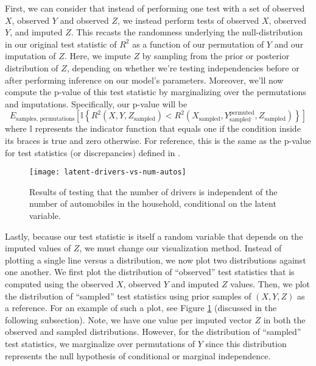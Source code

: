 First, we can consider that instead of performing one test with a set of observed $X$, observed $Y$ and observed $Z$, we instead perform tests of observed $X$, observed $Y$, and imputed $Z$.
This recasts the randomness underlying the null-distribution in our original test statistic of $R^2$ as a function of our permutation of $Y$ and our imputation of $Z$.
Here, we impute $Z$ by sampling from the prior or posterior distribution of $Z$, depending on whether we're testing independencies before or after performing inference on our model's parameters.
Moreover, we'll now compute the p-value of this test statistic by marginalizing over the permutations and imputations.
Specifically, our p-value will be
\begin{equation}
E_{\textrm{samples, permutations}} \left[ \mathbb{I} \left \lbrace R^2 \left( X, Y, Z_{\textrm{sampled}} \right) <  R^2 \left( X_{\textrm{sampled}}, Y_{\textrm{sampled}} ^{\textrm{permuted}}, Z_{\textrm{sampled}} \right) \right \rbrace \right]
\end{equation}
where $\mathbb{I}$ represents the indicator function that equals one if the condition inside its braces is true and zero otherwise.
For reference, this is the same as the p-value for test statistics (or discrepancies) defined in \citet[Eq. 7]{gelman_1996_posterior}.

\begin{figure}
   \centering
   \texttt{[image: latent-drivers-vs-num-autos]}
   \caption{Results of testing that the number of drivers is independent of the number of automobiles in the household, conditional on the latent variable.}
   \label{fig:latent-cit-results}
\end{figure}

Lastly, because our test statistic is itself a random variable that depends on the imputed values of $Z$, we must change our visualization method.
Instead of plotting a single line versus a distribution, we now plot two distributions against one another.
We first plot the distribution of ``observed'' test statistics that is computed using the observed $X$, observed $Y$ and imputed $Z$ values.
Then, we plot the distribution of ``sampled'' test statistics using prior samples of $\left( X, Y, Z \right)$ as a reference.
For an example of such a plot, see Figure \ref{fig:latent-cit-results} (discussed in the following subsection).
Note, we have one value per imputed vector $Z$ in both the observed and sampled distributions.
However, for the distribution of ``sampled'' test statistics, we marginalize over permutations of $Y$ since this distribution represents the null hypothesis of conditional or marginal independence.

